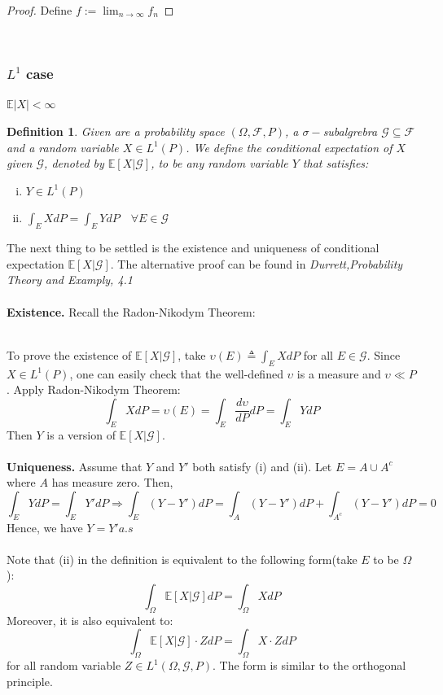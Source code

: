 \documentclass[11pt,english]{smfart}
\newtheorem{definition}[theorem]{Definition}
\newcommand{\vf}{\textbf}
\newcommand{\mb}{\mathbb}
\begin{document}
\begin{proof}
    Define $f := \lim_{n\rightarrow \infty} f_n$
\end{proof}

~\\
\subsubsection{$L^1$ case} 
$\mb{E}|X| < \infty$
~\\
\begin{definition}
    Given are a probability space $(\Omega,\mathcal{F},P)$, a $\sigma-$subalgrebra $\mathcal{G} \subseteq \mathcal{F} $ and a random variable $X \in L^1(P)$. We define the conditional expectation of $X$ given $\mathcal{G}$, denoted by $\mb{E}[X|\mathcal{G}]$, to be any random variable $Y$ that satisfies:
    \begin{enumerate}[(i)]
        \item $Y \in L^1(P)$
        \item $\int_E X dP = \int_E Y dP \quad \forall E \in \mathcal{G}$
    \end{enumerate}
\end{definition}

The next thing to be settled is the existence and uniqueness of conditional expectation $\mb{E}[X|\mathcal{G}]$. The alternative proof can be found in \textit{Durrett,Probability Theory and Examply, 4.1}\\
~\\
\vf{Existence.} Recall the Radon-Nikodym Theorem:


~\\
To prove the existence of $\mb{E}[X|\mathcal{G}]$, take $\upsilon(E) \triangleq \int_E XdP$ for all $E \in \mathcal{G}$. Since $X\in L^1(P)$, one can easily check that the well-defined $\upsilon$ is a measure and $\upsilon \ll P$. Apply Radon-Nikodym Theorem:
$$
\int_E XdP = \upsilon(E) = \int_E \frac{d\upsilon}{dP}dP = \int_E YdP
$$
Then $Y$ is a version of $\mb{E}[X|\mathcal{G}]$. \\
~\\
\vf{Uniqueness.}
Assume that $Y$ and $Y'$ both satisfy (i) and (ii). Let $E = A\cup A^c$ where $A$ has measure zero. Then,
$$
\int_E YdP = \int_E Y'dP \Rightarrow \int_E (Y-Y')dP = \int_{A} (Y-Y')dP + \int_{A^c} (Y-Y')dP = 0
$$
Hence, we have $Y = Y' a.s$\\
~\\
Note that (ii) in the definition is equivalent to the following form(take $E$ to be $\Omega$):
$$
     \int_{\Omega} \mb{E}[X|\mathcal{G}]dP = \int_{\Omega} XdP
$$
Moreover, it is also equivalent to:
$$
\int_{\Omega} \mb{E}[X|\mathcal{G}]\cdot Z dP = \int_{\Omega} X\cdot ZdP
$$
for all random variable $Z \in L^1(\Omega,\mathcal{G},P)$. The form is similar to the orthogonal principle. 
\end{document}
